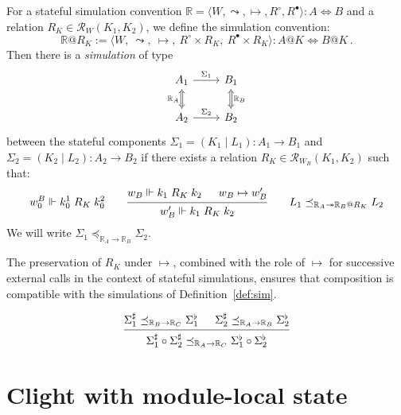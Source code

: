 \documentclass[acmsmall,screen,review,anonymous]{acmart}
\newcommand{\que}{\circ}
\newcommand{\ans}{\bullet}
\begin{document}
\begin{definition}[Simulation] \label{def:sim}
For a stateful simulation convention
$\mathbb{R} = \langle W, {\leadsto}, {\mapsto}, R^\circ, R^\bullet \rangle :
 A \Leftrightarrow B$
and a relation
$R_K \in \mathcal{R}_W(K_1, K_2)$,
we define the simulation convention:
\[
  \mathbb{R}@R_K :=
  \langle
    W, \: {\leadsto}, \: {\mapsto}, \:
    R^\que \times R_K, \:
    R^\ans \times R_K
  \rangle :
  A@K \Leftrightarrow B@K
  \,.
\]
Then there is a \emph{simulation} of type
\[
\begin{tikzcd}
  A_1 \ar[r, "\Sigma_1"]
      \ar[d, Leftrightarrow, "\mathbb{R}_A"'] &
  B_1 \ar[d, Leftrightarrow, "\mathbb{R}_B"] \\
  A_2 \ar[r, "\Sigma_2"] &
  B_2
\end{tikzcd}
\]
between
the stateful components
$\Sigma_1 = (K_1 \mid L_1) : A_1 \rightarrow B_1$ and
$\Sigma_2 = (K_2 \mid L_2) : A_2 \rightarrow B_2$
if there exists a relation
$R_K \in \mathcal{R}_{W_B}(K_1, K_2)$
such that:
\[
  w^B_0 \Vdash k^1_0 \mathrel{R_K} k^2_0
  \qquad
  \begin{prooftree}
    \hypo{w_B \Vdash k_1 \mathrel{R_K} k_2}
    \hypo{w_B \mapsto w_B'}
    \infer2{w_B' \Vdash k_1 \mathrel{R_K} k_2}
  \end{prooftree}
  \qquad
  L_1 \preceq_{\mathbb{R}_A \twoheadrightarrow \mathbb{R}_B@R_K} L_2
\]
We will write
$\Sigma_1 \preceq_{\mathbb{R}_A \rightarrow \mathbb{R}_B} \Sigma_2$.
\end{definition}

The preservation of $R_K$ under $\mapsto$,
combined with the role of $\mapsto$
for successive external calls
in the context of stateful simulations,
ensures that composition is compatible with
the simulations of Definition~\ref{def:sim}.

\begin{lemma}
\[
  \begin{prooftree}
    \hypo{
      \Sigma_1^\sharp
      \preceq_{\mathbb{R}_B \rightarrow \mathbb{R}_C}
      \Sigma_1^\flat}
    \hypo{
      \Sigma_2^\sharp
      \preceq_{\mathbb{R}_A \rightarrow \mathbb{R}_B}
      \Sigma_2^\flat}
    \infer2{
      \Sigma_1^\sharp \circ \Sigma_2^\sharp
      \preceq_{\mathbb{R}_A \rightarrow \mathbb{R}_C}
      \Sigma_1^\flat \circ \Sigma_2^\flat}
  \end{prooftree}
\]
\end{lemma}


\section{Clight with module-local state} %
\end{document}
